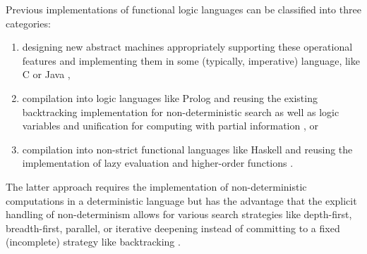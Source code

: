 \documentclass{llncs}
\begin{document}
Previous implementations of functional logic languages
can be classified into three categories:
\begin{enumerate}
 \item designing new abstract machines appropriately supporting
these operational features and implementing them in some (typically,
imperative) language, like C \cite{Lux99FLOPS}
or Java \cite{AntoyHanusLiuTolmach05,HanusSadre99JFLP},

 \item compilation into logic languages like Prolog and reusing
the existing backtracking implementation for non-deterministic
search as well as logic variables and unification for computing with partial
information \cite{AntoyHanus00FROCOS,Lopez-FraguasSanchez-Hernandez99}, or

 \item compilation into non-strict functional languages like Haskell
and reusing the implementation
of lazy evaluation and higher-order functions
\cite{BrasselHuch07,BrasselHuch09}.
\end{enumerate}
%
The latter approach requires the implementation
of non-deterministic computations in a deterministic language
but has the advantage
that the explicit handling of non-determinism allows for
various search strategies like depth-first, breadth-first, parallel,
or iterative deepening instead of committing to a fixed (incomplete)
strategy like backtracking \cite{BrasselHuch07}.
\end{document}
